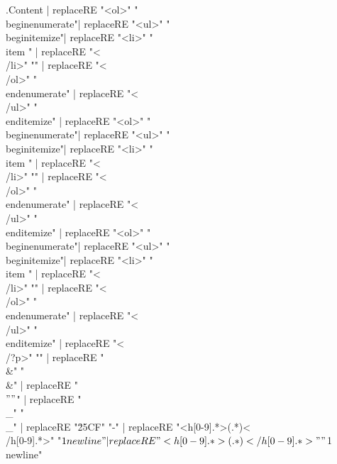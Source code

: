 \documentclass{report}
\begin{document}
              {{.Content | replaceRE "<ol>" "\\begin{enumerate}"| replaceRE "<ul>" "\\begin{itemize}"| replaceRE "<li>" "\\item " | replaceRE "<\\/li>" "" | replaceRE "<\\/ol>" "\\end{enumerate}" | replaceRE "<\\/ul>" "\\end{itemize}" | replaceRE "<ol>" "\\begin{enumerate}"| replaceRE "<ul>" "\\begin{itemize}"| replaceRE "<li>" "\\item " | replaceRE "<\\/li>" "" | replaceRE "<\\/ol>" "\\end{enumerate}" | replaceRE "<\\/ul>" "\\end{itemize}" | replaceRE "<ol>" "\\begin{enumerate}"| replaceRE "<ul>" "\\begin{itemize}"| replaceRE "<li>" "\\item " | replaceRE "<\\/li>" "" | replaceRE "<\\/ol>" "\\end{enumerate}" | replaceRE "<\\/ul>" "\\end{itemize}" | replaceRE "<\\/?p>" "" | replaceRE "\\&" "\\&" | replaceRE "\\$" "\\$" | replaceRE "\\_" "\\_" | replaceRE "\u25CF" "-" | replaceRE "<h[0-9].*>(.*)<\\/h[0-9].*>" "$1\\newline" | replaceRE "<h[0-9].*>(.*)<\\/h[0-9].*>" "$1\\newline"}}
\end{document}
